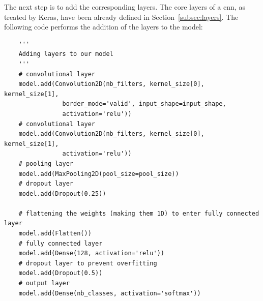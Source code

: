 The next step is to add the corresponding layers. The core layers of a \gls{cnn}, as treated by Keras, have been already defined in Section~\ref{subsec:layers}. The following code performs the addition of the layers to the model:
\begin{lstlisting}
    '''
    Adding layers to our model
    '''
    # convolutional layer
    model.add(Convolution2D(nb_filters, kernel_size[0], kernel_size[1],
			    border_mode='valid', input_shape=input_shape, 
			    activation='relu'))
    # convolutional layer
    model.add(Convolution2D(nb_filters, kernel_size[0], kernel_size[1],
			    activation='relu'))
    # pooling layer
    model.add(MaxPooling2D(pool_size=pool_size))
    # dropout layer
    model.add(Dropout(0.25))
    
    # flattening the weights (making them 1D) to enter fully connected layer
    model.add(Flatten())
    # fully connected layer
    model.add(Dense(128, activation='relu'))
    # dropout layer to prevent overfitting
    model.add(Dropout(0.5))
    # output layer
    model.add(Dense(nb_classes, activation='softmax'))
\end{lstlisting}

